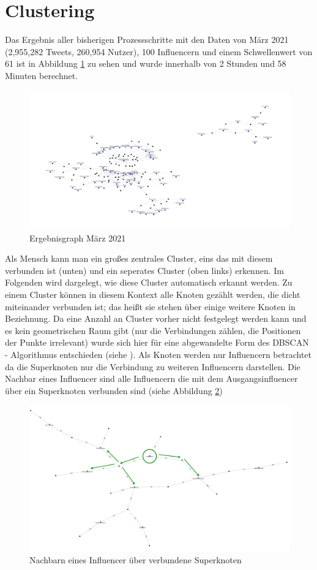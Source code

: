 \section{Clustering}
Das Ergebnis aller bisherigen Prozessschritte mit den Daten von März 2021 (2,955,282 Tweets, 260,954 Nutzer), 100 Influencern und einem Schwellenwert von 61 ist in Abbildung \ref{fig:noclusters} zu sehen und wurde innerhalb von 2 Stunden und 58 Minuten berechnet. 
\begin{figure}[h!]
	\centering
	\includegraphics[width=\linewidth]{images/NoClusters}
	\caption[]{Ergebnisgraph März 2021}
	\label{fig:noclusters}
\end{figure}
Als Mensch kann man ein  großes zentrales \gls{Cluster}, eins das mit diesem verbunden ist (unten) und ein seperates \gls{Cluster} (oben links) erkennen. 
Im Folgenden wird dargelegt, wie diese \gls{Cluster} automatisch erkannt werden.
Zu einem \gls{Cluster} können in diesem Kontext alle Knoten gezählt werden, die dicht miteinander verbunden ist; das heißt sie stehen über einige weitere Knoten in Beziehnung.
Da eine Anzahl an \gls{Cluster} vorher nicht festgelegt werden kann und es kein geometrischen Raum gibt (nur die Verbindungen zählen, die Positionen der Punkte irrelevant) wurde sich hier für eine abgewandelte Form des DBSCAN - Algorithmus entschieden (siehe ).
Als Knoten werden nur Influencern betrachtet da die Superknoten nur die Verbindung zu weiteren Influencern darstellen. 
Die Nachbar eines Influencer sind alle Influencern die mit dem Ausgangsinfluencer über ein Superknoten verbunden sind (siehe Abbildung \ref{fig:dbscan-neighbours})
\begin{figure}
	\centering
	\includegraphics[width=0.7\linewidth]{images/DBSCAN-neighbours}
	\caption[]{Nachbarn eines Influencer über verbundene Superknoten}
	\label{fig:dbscan-neighbours}
\end{figure}
